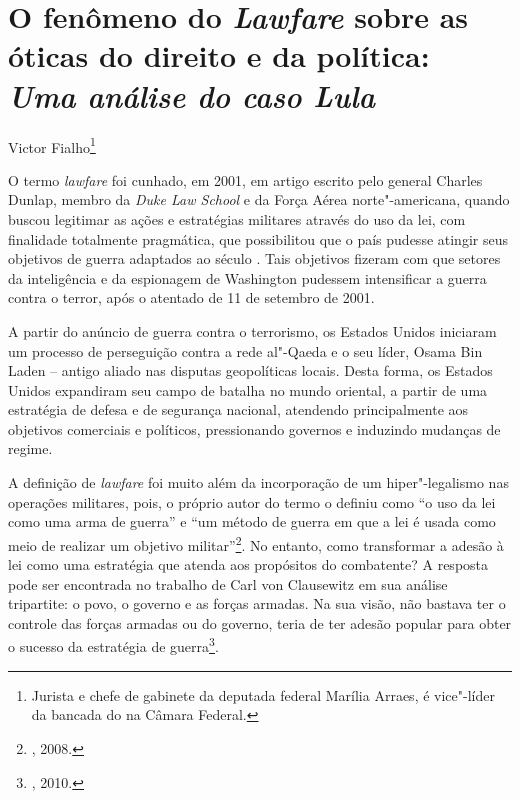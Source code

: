 \chapter*{O fenômeno do \emph{Lawfare} sobre as óticas do direito e da política:\\
\emph{Uma análise do caso Lula}}

\begin{flushright}
Victor Fialho\footnote{Jurista e chefe de gabinete da deputada federal Marília Arraes, é vice"-líder da bancada do  na Câmara Federal.}
\end{flushright}

O termo \emph{lawfare} foi cunhado, em 2001, em artigo escrito pelo
general Charles Dunlap, membro da \emph{Duke Law School} e da Força
Aérea norte"-americana, quando buscou legitimar as ações e estratégias
militares através do uso da lei, com finalidade totalmente pragmática,
que possibilitou que o país pudesse atingir seus objetivos de guerra
adaptados ao século . Tais objetivos fizeram com que setores da
inteligência e da espionagem de Washington pudessem intensificar a
guerra contra o terror, após o atentado de 11 de setembro de 2001.

A partir do anúncio de guerra contra o terrorismo, os Estados Unidos
iniciaram um processo de perseguição contra a rede al"-Qaeda e o seu
líder, Osama Bin Laden -- antigo aliado nas disputas geopolíticas locais.
Desta forma, os Estados Unidos expandiram seu campo de batalha no mundo
oriental, a partir de uma estratégia de defesa e de segurança nacional,
atendendo principalmente aos objetivos comerciais e políticos,
pressionando governos e induzindo mudanças de regime.

A definição de \emph{lawfare} foi muito além da incorporação de um
hiper"-legalismo nas operações militares, pois, o próprio autor do termo
o definiu como ``o uso da lei como uma arma de guerra'' e ``um método de
guerra em que a lei é usada como meio de realizar um objetivo militar''\footnote{, 2008.}. No entanto, como transformar a adesão à lei como uma
estratégia que atenda aos propósitos do combatente? A resposta pode ser
encontrada no trabalho de Carl von Clausewitz em sua análise tripartite:
o povo, o governo e as forças armadas. Na sua visão, não bastava ter o
controle das forças armadas ou do governo, teria de ter adesão popular
para obter o sucesso da estratégia de guerra\footnote{, 2010.}.


